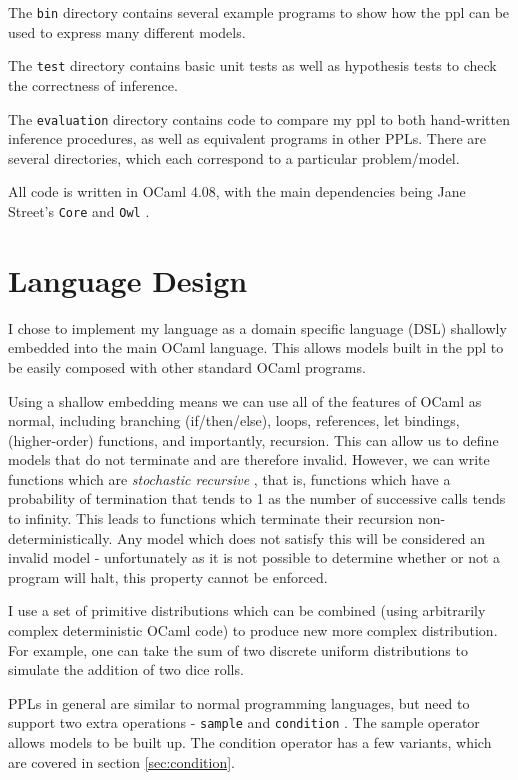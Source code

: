 The \texttt{bin} directory contains several example programs to show how the ppl can be used to express many different models. 

The \texttt{test} directory contains basic unit tests as well as hypothesis tests to check the correctness of inference.

The \texttt{evaluation} directory contains code to compare my ppl to both hand-written inference procedures, as well as equivalent programs in other PPLs. There are several directories, which each correspond to a particular problem/model.

All code is written in OCaml 4.08, with the main dependencies being Jane Street's \texttt{Core} and \texttt{Owl} \cite{owl}.	
	
\section{Language Design}
I chose to implement my language as a domain specific language (DSL) shallowly embedded into the main OCaml language. This allows models built in the ppl to be easily composed with other standard OCaml programs.
	
Using a shallow embedding means we can use all of the features of OCaml as normal, including branching (if/then/else), loops, references, let bindings, (higher-order) functions, and importantly, recursion. This can allow us to define models that do not terminate and are therefore invalid. However, we can write functions which are \textit{stochastic recursive} \cite{siegmund}, that is, functions which have a probability of termination that tends to 1 as the number of successive calls tends to infinity. This leads to functions which terminate their recursion non-deterministically. Any model which does not satisfy this will be considered an invalid model - unfortunately as it is not possible to determine whether or not a program will halt, this property cannot be enforced. 
	
I use a set of primitive distributions which can be combined (using arbitrarily complex deterministic OCaml code) to produce new more complex distribution. For example, one can take the sum of two discrete uniform distributions to simulate the addition of two dice rolls. 
	
PPLs in general are similar to normal programming languages, but need to support two extra operations - \texttt{sample} and \texttt{condition} \cite{gordon2014probabilistic}. The sample operator allows models to be built up. The condition operator has a few variants, which are covered in section \ref{sec:condition}.
	
